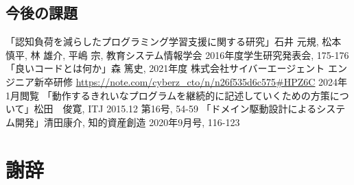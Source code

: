 \documentclass[12pt, a4paper]{jreport}
\begin{document}
\section{今後の課題}
\renewcommand{\bibname}{参考文献}
\begin{thebibliography}{10}
「認知負荷を減らしたプログラミング学習支援に関する研究」石井 元規, 松本 慎平, 林 雄介, 平嶋 宗, 教育システム情報学会 2016年度学生研究発表会, 175-176
「良いコードとは何か」森 篤史, 2021年度 株式会社サイバーエージェント エンジニア新卒研修
\url{https://note.com/cyberz_cto/n/n26f535d6c575#HPZ6C} 2024年1月閲覧
「動作するきれいなプログラムを継続的に記述していくための方策について」松田　俊寛, ITJ 2015.12 第16号, 54-59
「ドメイン駆動設計によるシステム開発」清田康介, 知的資産創造 2020年9月号, 116-123
\end{thebibliography}

\chapter*{謝辞}
\end{document}
